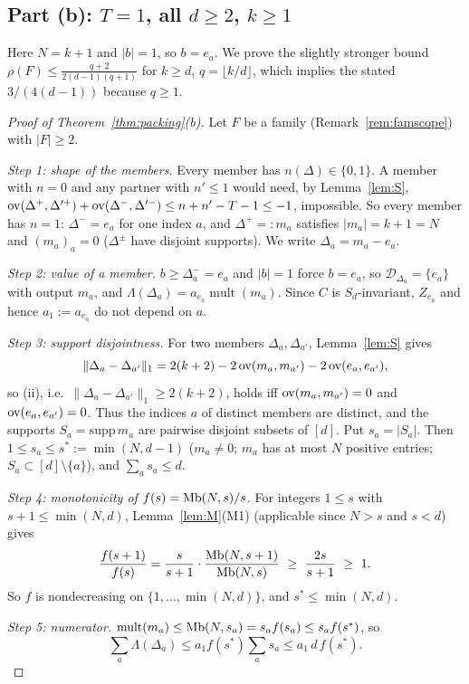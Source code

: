 \documentclass[11pt]{article}
\newcommand{\mult}{\operatorname{mult}}
\theoremstyle{definition}
\theoremstyle{remark}
\begin{document}
\subsection{Part (b): \texorpdfstring{$T=1$}{T=1}, all \texorpdfstring{$d\ge2$}{d>=2}, \texorpdfstring{$k\ge1$}{k>=1}}\label{app:T1}
Here $N=k+1$ and $|b|=1$, so $b=e_a$. We prove the slightly stronger bound $\rho(F)\le\frac{q+2}{2(d-1)(q+1)}$ for $k\ge d$, $q=\lfloor k/d\rfloor$,
which implies the stated $3/(4(d-1))$ because $q\ge1$.
\begin{proof}[Proof of Theorem~\ref{thm:packing}(b)]
Let $F$ be a family (Remark~\ref{rem:famscope}) with $|F|\ge2$.

\emph{Step 1: shape of the members.} Every member has $n(\Delta)\in\{0,1\}$. A member with $n=0$ and any partner with $n'\le1$ would need, by
Lemma~\ref{lem:S}, $\mathrm{ov}(\Delta^+,\Delta'^+)+\mathrm{ov}(\Delta^-,\Delta'^-)\le n+n'-T-1\le-1$, impossible. So every member has $n=1$:
$\Delta^-=e_a$ for one index $a$, and $\Delta^+=:m_a$ satisfies $|m_a|=k+1=N$ and $(m_a)_a=0$ ($\Delta^\pm$ have disjoint supports). We write
$\Delta_a=m_a-e_a$.

\emph{Step 2: value of a member.} $b\ge\Delta_a^-=e_a$ and $|b|=1$ force $b=e_a$, so $\mathcal D_{\Delta_a}=\{e_a\}$ with output $m_a$, and
$\Lambda(\Delta_a)=a_{e_a}\mult(m_a)$. Since $C$ is $S_d$-invariant, $Z_{e_a}$ and hence $a_1:=a_{e_a}$ do not depend on $a$.

\emph{Step 3: support disjointness.} For two members $\Delta_a,\Delta_{a'}$, Lemma~\ref{lem:S} gives
\[
\lVert\Delta_a-\Delta_{a'}\rVert_1=2(k+2)-2\,\mathrm{ov}(m_a,m_{a'})-2\,\mathrm{ov}(e_a,e_{a'}),
\]
so (ii), i.e.\ $\lVert\Delta_a-\Delta_{a'}\rVert_1\ge2(k+2)$, holds iff $\mathrm{ov}(m_a,m_{a'})=0$ and $\mathrm{ov}(e_a,e_{a'})=0$. Thus the indices $a$ of distinct members are
distinct, and the supports $S_a=\mathrm{supp}\,m_a$ are pairwise disjoint subsets of $[d]$. Put $s_a=|S_a|$. Then $1\le s_a\le s^\ast:=\min(N,d-1)$
($m_a\ne0$; $m_a$ has at most $N$ positive entries; $S_a\subset[d]\setminus\{a\}$), and $\sum_as_a\le d$.

\emph{Step 4: monotonicity of $f(s)=\mathrm{Mb}(N,s)/s$.} For integers $1\le s$ with $s+1\le\min(N,d)$, Lemma~\ref{lem:M}(M1) (applicable since $N>s$ and $s<d$) gives
\[
\frac{f(s+1)}{f(s)}=\frac{s}{s+1}\cdot\frac{\Mb(N,s+1)}{\Mb(N,s)}\ \ge\ \frac{2s}{s+1}\ \ge\ 1 .
\]
So $f$ is nondecreasing on $\{1,\dots,\min(N,d)\}$, and $s^\ast\le\min(N,d)$.

\emph{Step 5: numerator.} $\mult(m_a)\le\Mb(N,s_a)=s_af(s_a)\le s_af(s^\ast)$, so
\[\textstyle\sum_a\Lambda(\Delta_a)\le a_1f(s^\ast)\sum_as_a\le a_1\,d\,f(s^\ast).\]


\end{proof}
\end{document}
